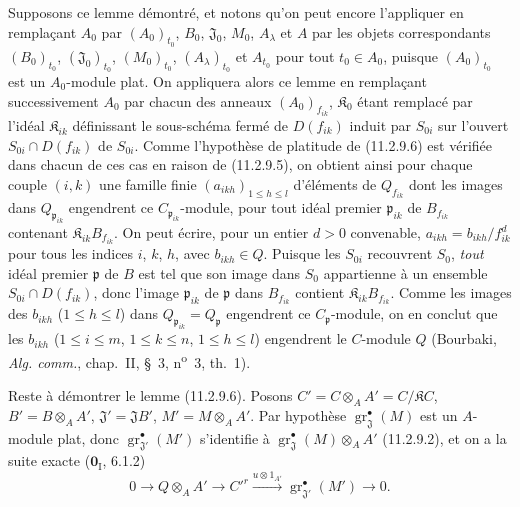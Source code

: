 Supposons ce lemme démontré, et notons qu'on peut encore l'appliquer en
remplaçant $A_0$ par $(A_0)_{t_0}$, $B_0$, $\mathfrak J_0$, $M_0$,
$A_\lambda$ et $A$ par les objets correspondants $(B_0)_{t_0}$,
$(\mathfrak J_0)_{t_0}$, $(M_0)_{t_0}$, $(A_\lambda)_{t_0}$ et $A_{t_0}$ pour
tout $t_0\in A_0$, puisque $(A_0)_{t_0}$ est un $A_0$-module plat. On
appliquera alors ce lemme en remplaçant successivement $A_0$ par chacun des
anneaux $(A_0)_{f_{ik}}$, $\mathfrak K_0$ étant remplacé par l'idéal
$\mathfrak K_{ik}$ définissant le sous-schéma fermé de $D(f_{ik})$ induit par
$S_{0i}$ sur l'ouvert $S_{0i}\cap D(f_{ik})$ de $S_{0i}$. Comme l'hypothèse
de platitude de (11.2.9.6) est vérifiée dans chacun de ces cas en raison de
(11.2.9.5), on obtient ainsi pour chaque couple $(i,k)$ une famille finie
$(a_{ikh})_{1\leq h\leq l}$ d'éléments de $Q_{f_{ik}}$ dont les images dans
$Q_{\mathfrak p_{ik}}$ engendrent ce $C_{\mathfrak p_{ik}}$-module, pour tout
idéal premier $\mathfrak p_{ik}$ de $B_{f_{ik}}$ contenant
$\mathfrak K_{ik}B_{f_{ik}}$. On peut écrire, pour un entier $d>0$ convenable,
$a_{ikh}=b_{ikh}/f_{ik}^d$ pour tous les indices $i$, $k$, $h$, avec
$b_{ikh}\in Q$. Puisque les $S_{0i}$ recouvrent $S_0$, \emph{tout} idéal premier
$\mathfrak p$ de $B$ est tel que son image dans $S_0$ appartienne à un
ensemble $S_{0i}\cap D(f_{ik})$, donc l'image $\mathfrak p_{ik}$ de
$\mathfrak p$ dans $B_{f_{ik}}$ contient $\mathfrak K_{ik}B_{f_{ik}}$. Comme
les images des $b_{ikh}$ ($1\leq h\leq l$) dans
$Q_{\mathfrak p_{ik}}=Q_\mathfrak p$ engendrent ce $C_\mathfrak p$-module,
on en conclut que les $b_{ikh}$
($1\leq i\leq m$, $1\leq k\leq n$, $1\leq h\leq l$) engendrent le
$C$-module $Q$ (Bourbaki, \emph{Alg. comm.}, chap.~II, \S~3, n\textsuperscript{o}~3,
th.~1).

Reste à démontrer le lemme (11.2.9.6). Posons
$C'=C\otimes_AA'=C/\mathfrak KC$, $B'=B\otimes_AA'$, $\mathfrak J'=\mathfrak JB'$,
$M'=M\otimes_AA'$.
Par hypothèse $\operatorname{gr}_{\mathfrak J}^\bullet(M)$ est un $A$-module plat,
donc $\operatorname{gr}_{\mathfrak J'}^\bullet(M')$ s'identifie à
$\operatorname{gr}_{\mathfrak J}^\bullet(M)\otimes_AA'$ (11.2.9.2), et on a la
suite exacte ($\mathbf 0_{\mathrm I}$, 6.1.2)
\begin{equation}
0\longrightarrow Q\otimes_AA'\longrightarrow C'^{r}
\xrightarrow{u\otimes1_{A'}}\operatorname{gr}_{\mathfrak J'}^\bullet(M')
\longrightarrow0.
\label{IV.11.2.9.7-fr}
\tag{11.2.9.7}
\end{equation}

